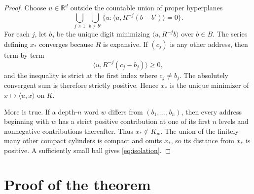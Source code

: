 \documentclass[11pt]{article}
\newcommand{\R}{\mathbb R}
\begin{document}
\begin{proof}
Choose $u\in\R^d$ outside the countable union of proper hyperplanes
\[
 \bigcup_{j\geq1}\ \bigcup_{b\ne b'}
 \{u:\langle u,R^{-j}(b-b')\rangle=0\}.
\]
For each $j$, let $b_j$ be the unique digit minimizing
$\langle u,R^{-j}b\rangle$ over $b\in B$.  The series defining $x_*$
converges because $R$ is expansive.  If $(c_j)$ is any other address, then
term by term
\[
 \langle u,R^{-j}(c_j-b_j)\rangle\geq0,
\]
and the inequality is strict at the first index where $c_j\ne b_j$.
The absolutely convergent sum is therefore strictly positive.  Hence $x_*$
is the unique minimizer of $x\mapsto\langle u,x\rangle$ on $K$.

More is true.  If a depth-$n$ word $w$ differs from
$(b_1,\ldots,b_n)$, then every address beginning with $w$ has a strict
positive contribution at one of its first $n$ levels and nonnegative
contributions thereafter.  Thus $x_*\notin K_w$.  The union of the finitely
many other compact cylinders is compact and omits $x_*$, so its distance
from $x_*$ is positive.  A sufficiently small ball gives
\eqref{eq:isolation}.
\end{proof}

\section{Proof of the theorem}
\end{document}
